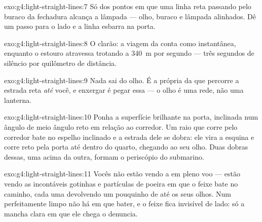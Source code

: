 \begin{solution}{exo:g4:light-straight-lines:7}
Só dos pontos em que uma linha reta passando pelo buraco da fechadura
alcança a lâmpada --- olho, buraco e lâmpada alinhados. Dê um passo
para o lado e a linha esbarra na porta.
\end{solution}

\begin{solution}{exo:g4:light-straight-lines:8}
O clarão: a viagem da  conta como instantânea, enquanto o estouro
atravessa trotando a \qty{340}{m} por segundo --- três segundos de
silêncio por quilômetro de distância.
\end{solution}

\begin{solution}{exo:g4:light-straight-lines:9}
Nada sai do olho. É a  própria da  que percorre a estrada
reta \emph{até} você, e enxergar é pegar essa  --- o olho é uma
rede, não uma lanterna.
\end{solution}

\begin{solution}{exo:g4:light-straight-lines:10}
Ponha a superfície brilhante na porta, inclinada num ângulo de meio
ângulo reto em relação ao corredor. Um raio que corre pelo corredor
bate no espelho inclinado e a estrada dele se dobra: ele vira a
esquina e corre reto pela porta até dentro do quarto, chegando ao seu
olho. Duas dobras dessas, uma acima da outra, formam o periscópio do
submarino.
\end{solution}

\begin{solution}{exo:g4:light-straight-lines:11}
Vocês não estão vendo a  em pleno voo --- estão vendo as
incontáveis gotinhas e partículas de poeira em que o feixe bate no
caminho, cada uma devolvendo um pouquinho de  até os seus olhos.
Num  perfeitamente limpo não há em que bater, e o feixe fica
invisível de lado: só a mancha clara em que ele chega o denuncia.
\end{solution}
